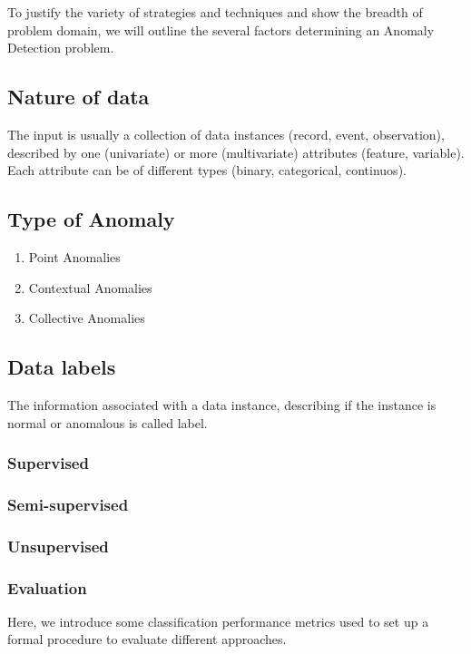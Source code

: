 To justify the variety of strategies and techniques and show the breadth of problem domain, we will outline the several factors determining an Anomaly Detection problem.

\subsection{Nature of data}

The input is usually a collection of data instances (record, event, observation), described by one (univariate) or more (multivariate) attributes (feature, variable). Each attribute can be of different types (binary, categorical, continuos).

\subsection{Type of Anomaly}

\begin{enumerate}
	\item Point Anomalies
	\item Contextual Anomalies
	\item Collective Anomalies
\end{enumerate}


\subsection{Data labels}

The information associated with a data instance, describing if the instance is normal or anomalous is called label.


\subsubsection{Supervised}
\subsubsection{Semi-supervised}
\subsubsection{Unsupervised}

\subsubsection{Evaluation}

Here, we introduce some classification performance metrics used to set up a formal procedure to evaluate different approaches.

